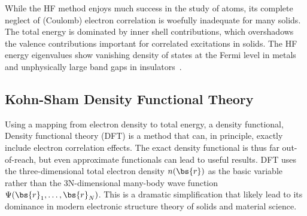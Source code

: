 While the HF method enjoys much success in the study of atoms, its complete neglect of (Coulomb) electron correlation is woefully inadequate for many solids. The total energy is dominated by inner shell contributions, which overshadows the valence contributions important for correlated excitations in solids.
The HF energy eigenvalues show vanishing density of states at the Fermi level in metals and unphysically large band gaps in insulators~\cite{Perdew1981}.

\subsection{Kohn-Sham Density Functional Theory}

Using a mapping from electron density to total energy, a density functional, Density functional theory (DFT) is a method that can, in principle, exactly include electron correlation effects.
The exact density functional is thus far out-of-reach, but even approximate functionals can lead to useful results.
DFT uses the three-dimensional total electron density $n(\bs{r})$ as the basic variable rather than the 3N-dimensional many-body wave function $\Psi(\bs{r}_1,\dots,\bs{r}_N)$. This is a dramatic simplification that likely lead to its dominance in modern electronic structure theory of solids and material science.

